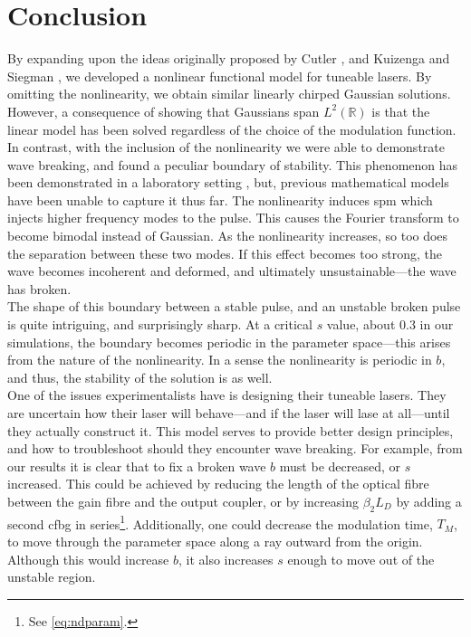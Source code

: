 
\chapter{Conclusion}
By expanding upon the ideas originally proposed by Cutler \cite{cutler}, and Kuizenga and Siegman \cite{kuizenga1970, kuizenga1970a, siegman}, we developed a nonlinear functional model for tuneable lasers. By omitting the nonlinearity, we obtain similar linearly chirped Gaussian solutions. However, a consequence of showing that Gaussians span $L^2(\mathbb{R})$ is that the linear model has been solved regardless of the choice of the modulation function. \\

In contrast, with the inclusion of the nonlinearity we were able to demonstrate wave breaking, and found a peculiar boundary of stability. This phenomenon has been demonstrated in a laboratory setting \cite{agrawal2013, anderson, finot, rothenberg, tomlinson}, but, previous mathematical models have been unable to capture it thus far. The nonlinearity induces \gls{spm} which injects higher frequency modes to the pulse. This causes the Fourier transform to become bimodal instead of Gaussian. As the nonlinearity increases, so too does the separation between these two modes. If this effect becomes too strong, the wave becomes incoherent and deformed, and ultimately unsustainable---the wave has broken. \\

The shape of this boundary between a stable pulse, and an unstable broken pulse is quite intriguing, and surprisingly sharp. At a critical $s$ value, about 0.3 in our simulations, the boundary becomes periodic in the parameter space---this arises from the nature of the nonlinearity. In a sense the nonlinearity is periodic in $b$, and thus, the stability of the solution is as well. \\

One of the issues experimentalists have is designing their tuneable lasers. They are uncertain how their laser will behave---and if the laser will lase at all---until they actually construct it. This model serves to provide better design principles, and how to troubleshoot should they encounter wave breaking. For example, from our results it is clear that to fix a broken wave $b$ must be decreased, or $s$ increased. This could be achieved by reducing the length of the optical fibre between the gain fibre and the output coupler, or by increasing $\beta_2 L_D$ by adding a second \gls{cfbg} in series\footnote{See \eqref{eq:ndparam}.}. Additionally, one could decrease  the modulation time, $T_M$, to move through the parameter space along a ray outward from the origin. Although this would increase $b$, it also increases $s$ enough to move out of the unstable region. \\

